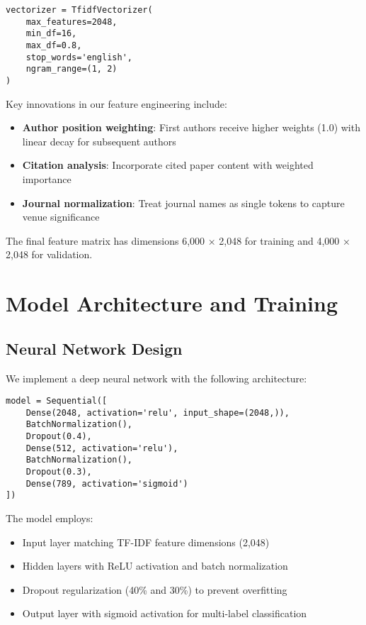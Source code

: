 \documentclass[preprint,12pt]{elsarticle}
\begin{document}
\begin{verbatim}
vectorizer = TfidfVectorizer(
    max_features=2048,
    min_df=16,
    max_df=0.8,
    stop_words='english',
    ngram_range=(1, 2)
)
\end{verbatim}

Key innovations in our feature engineering include:
\begin{itemize}
    \item \textbf{Author position weighting}: First authors receive higher weights (1.0) with linear decay for subsequent authors
    \item \textbf{Citation analysis}: Incorporate cited paper content with weighted importance
    \item \textbf{Journal normalization}: Treat journal names as single tokens to capture venue significance
\end{itemize}

The final feature matrix has dimensions 6,000 × 2,048 for training and 4,000 × 2,048 for validation.

\section{Model Architecture and Training}
\label{sec3}

\subsection{Neural Network Design}
We implement a deep neural network with the following architecture:

\begin{verbatim}
model = Sequential([
    Dense(2048, activation='relu', input_shape=(2048,)),
    BatchNormalization(),
    Dropout(0.4),
    Dense(512, activation='relu'),
    BatchNormalization(),
    Dropout(0.3),
    Dense(789, activation='sigmoid')
])
\end{verbatim}

The model employs:
\begin{itemize}
    \item Input layer matching TF-IDF feature dimensions (2,048)
    \item Hidden layers with ReLU activation and batch normalization
    \item Dropout regularization (40\% and 30\%) to prevent overfitting
    \item Output layer with sigmoid activation for multi-label classification
\end{itemize}
\end{document}
